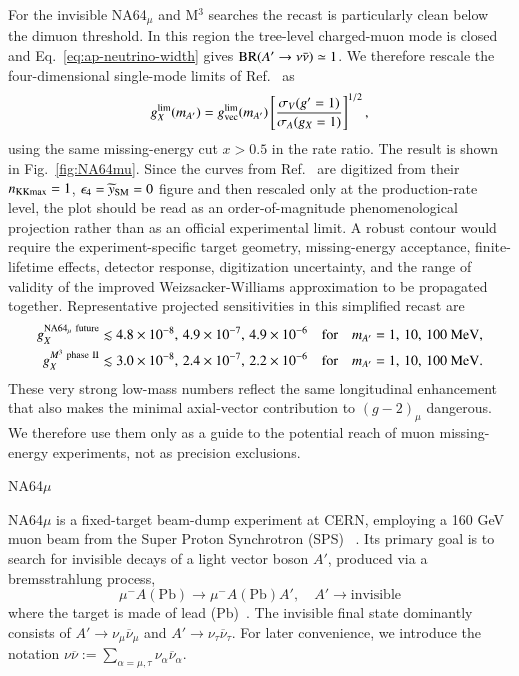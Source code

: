 \documentclass[onecolumn, aps, nofootinbib, prd, preprint, floats, floatfix, amsmath, amssymb, superscriptaddress, preprintnumbers]{revtex4-1}
\begin{document}
For the invisible NA64$_\mu$ and M$^3$ searches the recast is particularly clean below the dimuon threshold. In this region the tree-level charged-muon mode is closed and Eq.~\eqref{eq:ap-neutrino-width} gives \({\rm BR}(A'\to\nu\bar\nu)\simeq1\). We therefore rescale the four-dimensional single-mode limits of Ref.~\cite{Chakraborty:2025jbd} as
\begin{equation}
g_X^{\rm lim}(m_{A'})
=g_{\rm vec}^{\rm lim}(m_{A'})
\left[
\frac{\sigma_V(g'=1)}{\sigma_A(g_X=1)}
\right]^{1/2},
\label{eq:beamdump-rescale}
\end{equation}
using the same missing-energy cut \(x>0.5\) in the rate ratio. The result is shown in Fig.~\ref{fig:NA64mu}. Since the curves from Ref.~\cite{Chakraborty:2025jbd} are digitized from their \(n_{\rm KKmax}=1\), \(\epsilon_4=\widetilde y_{\rm SM}=0\) figure and then rescaled only at the production-rate level, the plot should be read as an order-of-magnitude phenomenological projection rather than as an official experimental limit. A robust contour would require the experiment-specific target geometry, missing-energy acceptance, finite-lifetime effects, detector response, digitization uncertainty, and the range of validity of the improved Weizsacker-Williams approximation to be propagated together. Representative projected sensitivities in this simplified recast are
\begin{align}
g_X^{\rm NA64_\mu~future}
&\lesssim 4.8\times10^{-8},\,4.9\times10^{-7},\,4.9\times10^{-6}
\quad{\rm for}\quad
m_{A'}=1,\,10,\,100~{\rm MeV},\nonumber\\
g_X^{M^3~{\rm phase~II}}
&\lesssim 3.0\times10^{-8},\,2.4\times10^{-7},\,2.2\times10^{-6}
\quad{\rm for}\quad
m_{A'}=1,\,10,\,100~{\rm MeV}.
\label{eq:beamdump-numbers}
\end{align}
These very strong low-mass numbers reflect the same longitudinal enhancement that also makes the minimal axial-vector contribution to \((g-2)_\mu\) dangerous. We therefore use them only as a guide to the potential reach of muon missing-energy experiments, not as precision exclusions.

NA64$\mu$

NA64$\mu$ is a fixed-target beam-dump experiment at CERN, employing a 160 GeV muon beam from the Super Proton Synchrotron (SPS) ~\cite{doble1994upgraded}. Its primary goal is to search for invisible decays of a light vector boson $A'$, produced via a bremsstrahlung process,
\begin{equation}
    \mu^- A(\text{Pb}) \to \mu^- A(\text{Pb}) A', \quad A' \to \text{invisible}
    \label{eq:NA64production}
\end{equation}
where the target is made of lead (Pb)~\cite{andreev2024exploration}. The invisible final state dominantly consists of $A' \to \nu_\mu\overline{\nu}_\mu$ and $A' \to \nu_\tau\overline{\nu}_\tau$. For later convenience, we introduce the notation $\nu\overline{\nu} := \sum_{\alpha=\mu,\tau} \nu_\alpha\overline{\nu}_\alpha$.
\end{document}

